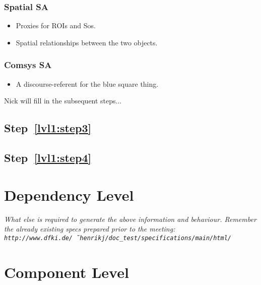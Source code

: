 \documentclass{article}
\begin{document}
\subsubsection{Spatial SA}
\begin{itemize}
\item Proxies for ROIs and Sos.
\item Spatial relationships between the two objects.
\end{itemize}

\subsubsection{Comsys SA}
\begin{itemize}
\item A discourse-referent for the blue square thing.
\end{itemize}

Nick will fill in the subsequent steps...

\subsection{Step~\ref{lvl1:step3}}




\subsection{Step~\ref{lvl1:step4}}






\section{Dependency Level}

\textit{
  What else is required to generate the above information and
  behaviour. Remember the already existing specs prepared prior to the
  meeting: \texttt{http://www.dfki.de/\~\ henrikj/doc\_test/specifications/main/html/}}



\section{Component Level}
\end{document}
